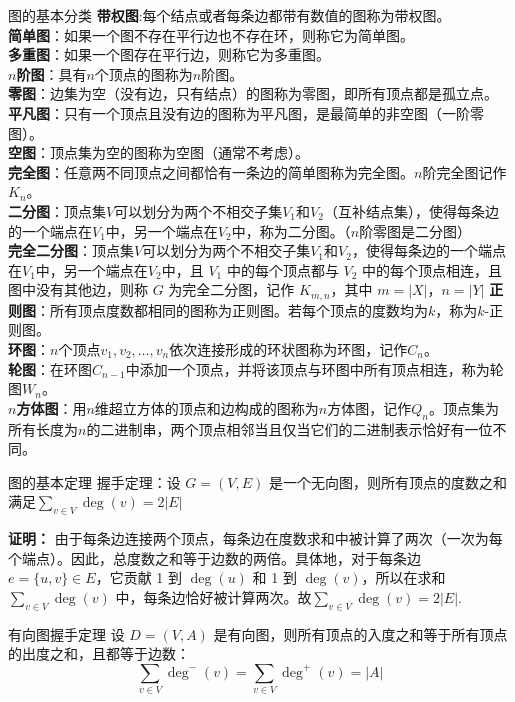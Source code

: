 \begin{definition}{图的基本分类}{}
\textbf{带权图}:每个结点或者每条边都带有数值的图称为带权图。\\
\textbf{简单图}：如果一个图不存在平行边也不存在环，则称它为简单图。\\
\textbf{多重图}：如果一个图存在平行边，则称它为多重图。\\
\textbf{$n$阶图}：具有$n$个顶点的图称为$n$阶图。\\
\textbf{零图}：边集为空（没有边，只有结点）的图称为零图，即所有顶点都是孤立点。\\
\textbf{平凡图}：只有一个顶点且没有边的图称为平凡图，是最简单的非空图（一阶零图）。\\
\textbf{空图}：顶点集为空的图称为空图（通常不考虑）。\\
\textbf{完全图}：任意两不同顶点之间都恰有一条边的简单图称为完全图。$n$阶完全图记作$K_n$。\\
\textbf{二分图}：顶点集$V$可以划分为两个不相交子集$V_1$和$V_2$（互补结点集），使得每条边的一个端点在$V_1$中，另一个端点在$V_2$中，称为二分图。（$n$阶零图是二分图）\\
\textbf{完全二分图}：顶点集$V$可以划分为两个不相交子集$V_1$和$V_2$，使得每条边的一个端点在$V_1$中，另一个端点在$V_2$中，且 $V_1$ 中的每个顶点都与 $V_2$ 中的每个顶点相连，且图中没有其他边，则称 $G$ 为完全二分图，记作 $K_{m,n}$，其中 $m = |X|$，$n = |Y|$
\textbf{正则图}：所有顶点度数都相同的图称为正则图。若每个顶点的度数均为$k$，称为$k$-正则图。\\
\textbf{环图}：$n$个顶点$v_1,v_2,\ldots,v_n$依次连接形成的环状图称为环图，记作$C_n$。\\
\textbf{轮图}：在环图$C_{n-1}$中添加一个顶点，并将该顶点与环图中所有顶点相连，称为轮图$W_n$。\\
\textbf{$n$方体图}：用$n$维超立方体的顶点和边构成的图称为$n$方体图，记作$Q_n$。顶点集为所有长度为$n$的二进制串，两个顶点相邻当且仅当它们的二进制表示恰好有一位不同。
\end{definition}
\begin{theorem}{图的基本定理}{}
握手定理：设 $G = (V, E)$ 是一个无向图，则所有顶点的度数之和满足$\displaystyle\sum_{v \in V} \deg(v) = 2|E|$
\end{theorem}
\textbf{证明：} 由于每条边连接两个顶点，每条边在度数求和中被计算了两次（一次为每个端点）。因此，总度数之和等于边数的两倍。具体地，对于每条边 $e = \{u, v\} \in E$，它贡献 1 到 $\deg(u)$ 和 1 到 $\deg(v)$，所以在求和 $\sum_{v \in V} \deg(v)$ 中，每条边恰好被计算两次。故$\displaystyle\sum_{v \in V} \deg(v) = 2|E|$.
\begin{theorem}{有向图握手定理}{}
设 $D = (V, A)$ 是有向图，则所有顶点的入度之和等于所有顶点的出度之和，且都等于边数：
\[
\sum_{v \in V} \deg^-(v) = \sum_{v \in V} \deg^+(v) = |A|
\]
\end{theorem}
